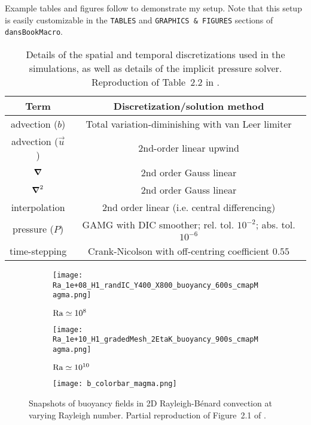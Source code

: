 Example tables and figures follow to demonstrate my setup.
Note that this setup is easily customizable in the \verb!TABLES! and \verb!GRAPHICS & FIGURES! sections of \verb!dansBookMacro!.

\begin{center}
\begin{table}[t!hb]
\centering
    \begin{tabular}{ c | c }
    Term                    & Discretization/solution method        \\
    \hline
    \hline
    advection ($b$)         & Total variation-diminishing with van Leer limiter \\
    advection ($\vec{u}$)   & 2nd-order linear upwind   \\
    $\grad$                 & 2nd order Gauss linear    \\
    $\grad^2$            & 2nd order Gauss linear    \\
    interpolation           & 2nd order linear (i.e. central differencing)  \\
    pressure ($P$)          & GAMG with DIC smoother; rel. tol. $10^{-2}$; abs. tol. $10^{-6}$  \\
    \hline
    time-stepping           & Crank-Nicolson with off-centring coefficient $0.55$
    \end{tabular}
    \caption[Example table.]{
        Details of the spatial and temporal discretizations used in the simulations, as well as details of the implicit pressure solver.
        Reproduction of Table~2.2 in \textcite{phd:Shipley2021}.
    }
    \label{tab:solverDetails}
\end{table}
\end{center}
\begin{figure}[t!hb]
    \centering
    \begin{subfigure}{0.49\textwidth}
        \caption{$\operatorname{Ra} \simeq 10^8$}
        \texttt{[image: Ra\_1e+08\_H1\_randIC\_Y400\_X800\_buoyancy\_600s\_cmapMagma.png]}
    \end{subfigure}
    \begin{subfigure}{0.49\textwidth}
        \caption{$\operatorname{Ra} \simeq 10^{10}$}
        \texttt{[image: Ra\_1e+10\_H1\_gradedMesh\_2EtaK\_buoyancy\_900s\_cmapMagma.png]}
    \end{subfigure}
    \begin{subfigure}[c]{\textwidth}
        \caption*{}
        \texttt{[image: b\_colorbar\_magma.png]}
    \end{subfigure}
    \caption[Example small figure.]{
        Snapshots of buoyancy fields in 2D Rayleigh-B\'{e}nard convection at varying Rayleigh number.
        Partial reproduction of Figure~2.1 of \textcite{phd:Shipley2021}.
    }\label{fig:DNS_RBCexamples}
\end{figure}
